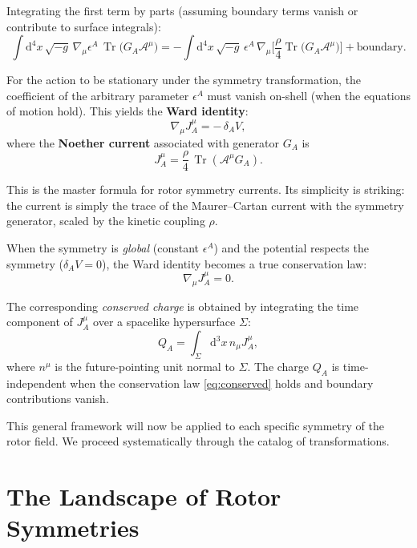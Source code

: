 \documentclass[11pt,a4paper]{article}
\numberwithin{equation}{section}
\theoremstyle{plain}
\theoremstyle{definition}
\theoremstyle{remark}
\DeclareMathOperator{\Tr}{Tr}
\newcommand{\dd}{\mathrm{d}}
\begin{document}
Integrating the first term by parts (assuming boundary terms vanish or contribute to surface integrals):
\begin{equation}
\int \dd^4x\,\sqrt{-g}\, \nabla_\mu \epsilon^A \,\Tr\!\big(G_A\mathcal{A}^\mu\big) = -\int \dd^4x\,\sqrt{-g}\, \epsilon^A \,\nabla_\mu\!\Big[\frac{\rho}{4}\Tr\!\big(G_A\mathcal{A}^\mu\big)\Big] + \text{boundary}.
\end{equation}

For the action to be stationary under the symmetry transformation, the coefficient of the arbitrary parameter $\epsilon^A$ must vanish on-shell (when the equations of motion hold). This yields the \textbf{Ward identity}:
\begin{equation}
\nabla_\mu J^\mu_A = -\,\delta_A V,
\label{eq:ward}
\end{equation}
where the \textbf{Noether current} associated with generator $G_A$ is
\begin{equation}
J^\mu_A = \frac{\rho}{4}\,\Tr(\mathcal{A}^\mu G_A).
\label{eq:J_general}
\end{equation}

This is the master formula for rotor symmetry currents. Its simplicity is striking: the current is simply the trace of the Maurer--Cartan current with the symmetry generator, scaled by the kinetic coupling $\rho$.

When the symmetry is \emph{global} (constant $\epsilon^A$) and the potential respects the symmetry ($\delta_A V = 0$), the Ward identity becomes a true conservation law:
\begin{equation}
\nabla_\mu J^\mu_A = 0.
\label{eq:conserved}
\end{equation}

The corresponding \emph{conserved charge} is obtained by integrating the time component of $J^\mu_A$ over a spacelike hypersurface $\Sigma$:
\begin{equation}
Q_A = \int_\Sigma \dd^3x\, n_\mu J^\mu_A,
\label{eq:charge}
\end{equation}
where $n^\mu$ is the future-pointing unit normal to $\Sigma$. The charge $Q_A$ is time-independent when the conservation law \eqref{eq:conserved} holds and boundary contributions vanish.

This general framework will now be applied to each specific symmetry of the rotor field. We proceed systematically through the catalog of transformations.

\section{The Landscape of Rotor Symmetries}
\label{sec:catalog}
\end{document}
